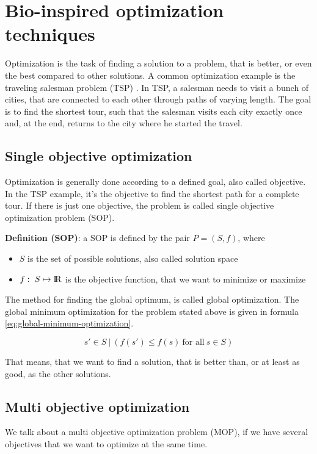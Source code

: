 \chapter{Bio-inspired optimization techniques}
\label{chap:bioalgorithms}

Optimization is the task of finding a solution to a problem, that is better, or even the best compared to other solutions. A common optimization example is the traveling salesman problem (TSP) \cite{alexander2005history}. In TSP, a salesman needs to visit a bunch of cities, that are connected to each other through paths of varying length. The goal is to find the shortest tour, such that the salesman visits each city exactly once and, at the end, returns to the city where he started the travel.

\section{Single objective optimization}
Optimization is generally done according to a defined goal, also called objective. In the TSP example, it's the objective to find the shortest path for a complete tour. If there is just one objective, the problem is called single objective optimization problem (SOP). 

\noindent\textbf{Definition (SOP)}: a SOP is defined by the pair $P=(S,f)$, where
\begin{itemize}
  \item $S$ is the set of possible solutions, also called solution space
  \item $f: \ S \mapsto {\rm I\!R}$ is the objective function, that we want to minimize or maximize
\end{itemize}
The method for finding the global optimum, is called global optimization. The global minimum optimization for the problem stated above is given in formula \eqref{eq:global-minimum-optimization}.

\begin{equation}\label{eq:global-minimum-optimization}
  s' \in S \ | \ (f(s') \leq f(s) \ \mbox{for all} \ s \in S)
\end{equation}

That means, that we want to find a solution, that is better than, or at least as good, as the other solutions.

\section{Multi objective optimization}
We talk about a multi objective optimization problem (MOP), if we have several objectives that we want to optimize at the same time.


